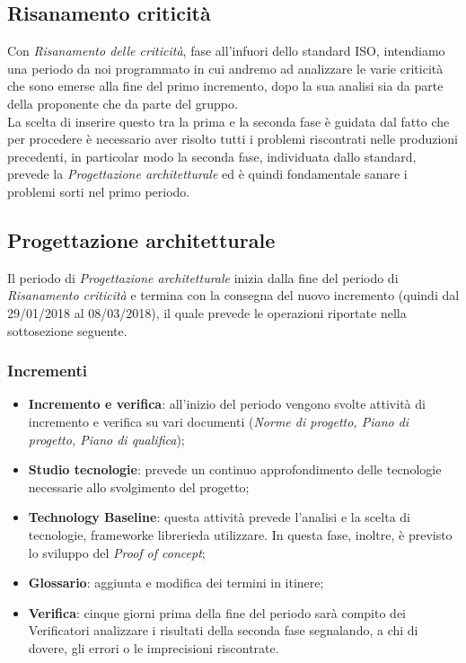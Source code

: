 \subsection{Risanamento criticità}

Con \textit{Risanamento delle criticità}, fase all'infuori dello standard ISO, intendiamo una periodo da noi programmato in cui andremo ad analizzare le varie criticità che sono emerse alla fine del primo incremento, dopo la sua analisi sia da parte della proponente che da parte del gruppo. \\
La scelta di inserire questo tra la prima e la seconda fase è guidata dal fatto che per procedere è necessario aver risolto tutti i problemi riscontrati nelle produzioni precedenti, in particolar modo la seconda fase, individuata dallo standard, prevede la \textit{Progettazione architetturale} ed è quindi fondamentale sanare i problemi sorti nel primo periodo. 

\subsection{Progettazione architetturale}

Il periodo di \textit{Progettazione architetturale} inizia dalla fine del periodo di \textit{Risanamento criticità} e termina con la consegna del nuovo incremento (quindi dal 29/01/2018 al 08/03/2018), il quale prevede le operazioni riportate nella sottosezione seguente.

\subsubsection{Incrementi}
\begin{itemize}
	\item \textbf{Incremento e verifica}: all'inizio del periodo vengono svolte attività di incremento e verifica su vari documenti (\textit{Norme di progetto, Piano di progetto, Piano di qualifica});
	\item \textbf{Studio tecnologie}: prevede un continuo approfondimento delle tecnologie necessarie allo svolgimento del progetto; 
	\item \textbf{Technology Baseline}\glossario: questa attività prevede l'analisi e la scelta di tecnologie, framework\glossario e librerie\glossario da utilizzare. In questa fase, inoltre, è previsto lo sviluppo del \textit{Proof of concept}\glossario;
	\item \textbf{Glossario}: aggiunta e modifica dei termini in itinere;  
	\item \textbf{Verifica}: cinque giorni prima della fine del periodo sarà compito dei Verificatori analizzare i risultati della seconda fase segnalando, a chi di dovere, gli errori o le imprecisioni riscontrate.
\end{itemize}

